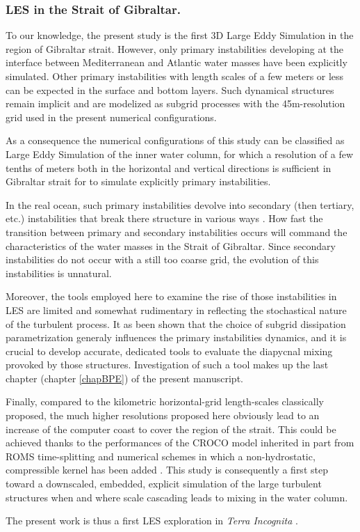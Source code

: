 \subsubsection{LES in the Strait of Gibraltar.}
To our knowledge, the present study is the first 3D Large Eddy Simulation in the region of Gibraltar strait. However, only primary instabilities developing at the interface between Mediterranean and Atlantic water masses have been explicitly simulated. Other primary instabilities  with length scales of a few meters or less can be expected in the surface and bottom layers. Such dynamical structures remain implicit and are modelized as subgrid processes with the 45m-resolution grid used in the present numerical configurations.

As a consequence the numerical configurations of this study can be  classified as Large Eddy Simulation of the inner water column, for which a resolution of a few tenths of meters both in the horizontal and vertical directions is sufficient in Gibraltar strait for to simulate explicitly primary instabilities.

In the real ocean, such primary instabilities devolve into secondary (then tertiary, etc.) instabilities that break there structure in various ways \citep{mashayek_2012}. How fast the transition between primary and secondary instabilities occurs will command the characteristics of the water masses in the Strait of Gibraltar. Since secondary instabilities do not occur with a still too coarse grid, the evolution of this instabilities is unnatural.

Moreover, the tools employed here to examine the rise of those instabilities in LES are limited and somewhat rudimentary in reflecting the stochastical nature of the turbulent process. It as been shown that the choice of subgrid dissipation parametrization generaly influences the primary instabilities dynamics, and it is crucial to develop accurate, dedicated tools to evaluate the diapycnal mixing provoked by those structures. Investigation of such a tool makes up the last chapter (chapter \ref{chapBPE}) of the present manuscript.

Finally, compared to the kilometric horizontal-grid length-scales classically proposed, the much higher resolutions proposed here obviously lead to an increase of the computer coast to cover the region of the strait. This could be achieved thanks to the performances of the CROCO model inherited in part from ROMS time-splitting and numerical schemes \citep{shchepetkin_regional_2005} in which a non-hydrostatic, compressible kernel has been added \citep{Auclair2018, hilt_2020}. This study is consequently a first step toward a downscaled, embedded, explicit simulation of the large turbulent structures when and where scale cascading leads to mixing in the water column.

The present work is thus a first LES exploration in \textit{Terra Incognita} \citep{scotti_large_2010, wyngaard_toward_2004}.\color{black}
\color{black}
